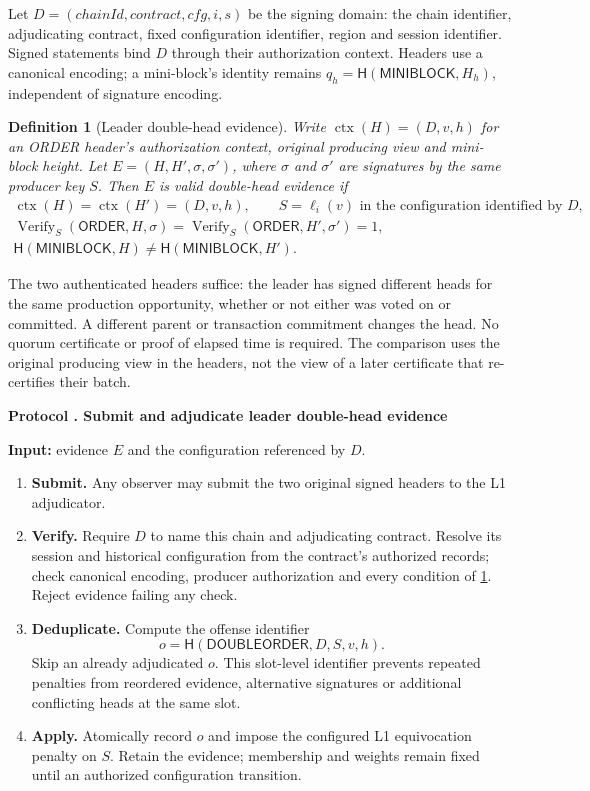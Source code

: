 \documentclass[11pt,a4paper,onecolumn]{article}
\newcommand{\Hash}{\mathsf H}
\newcommand{\Tag}[1]{\ensuremath{\mathsf{#1}}}
\newtheorem{definition}{Definition}[section]
\newcounter{protocol}
\newenvironment{protocol}[2]{\refstepcounter{protocol}\label{#1}
\begin{mdframed}[nobreak=true,linewidth=.6pt,skipabove=9pt,skipbelow=9pt,
innertopmargin=7pt,innerbottommargin=7pt]\small
\noindent\textbf{Protocol \theprotocol. #2}\par\smallskip}{\end{mdframed}}
\begin{document}
Let $D=(\mathit{chainId},\mathit{contract},\mathit{cfg},i,s)$ be the signing
domain: the chain identifier, adjudicating contract, fixed configuration
identifier, region and session identifier. Signed statements bind $D$ through their authorization
context. Headers use a canonical encoding; a mini-block's identity remains
$q_h=\Hash(\Tag{MINIBLOCK},H_h)$, independent of signature encoding.

\begin{definition}[Leader double-head evidence]\label{def:double-head}
Write $\operatorname{ctx}(H)=(D,v,h)$ for an ORDER header's authorization
context, original producing view and mini-block height. Let
$E=(H,H',\sigma,\sigma')$, where $\sigma$ and $\sigma'$ are signatures by
the same producer key $S$. Then $E$ is valid double-head evidence if
\[
 \begin{gathered}
 \operatorname{ctx}(H)=\operatorname{ctx}(H')=(D,v,h),
 \qquad S=\ell_i(v)\text{ in the configuration identified by }D,\\
 \operatorname{Verify}_{S}(\Tag{ORDER},H,\sigma)
 =\operatorname{Verify}_{S}(\Tag{ORDER},H',\sigma')=1,\\
 \Hash(\Tag{MINIBLOCK},H)\ne\Hash(\Tag{MINIBLOCK},H').
 \end{gathered}
\]
\end{definition}
The two authenticated headers suffice: the leader has signed different
heads for the same production opportunity, whether or not either was voted
on or committed. A different parent or transaction commitment changes the
head. No quorum certificate or proof of elapsed time is required.
The comparison uses the original producing view in the headers, not the view
of a later certificate that re-certifies their batch.

\begin{protocol}{alg:slash}{Submit and adjudicate leader double-head evidence}
\textbf{Input:} evidence $E$ and the configuration referenced by $D$.
\begin{enumerate}[label=\textbf{E\arabic*.}]
\item \textbf{Submit.} Any observer may submit the two original signed
headers to the L1 adjudicator.
\item \textbf{Verify.} Require $D$ to name this chain and adjudicating
contract. Resolve its session and historical configuration from the
contract's authorized records; check canonical encoding, producer
authorization and every condition of \cref{def:double-head}. Reject evidence
failing any check.
\item \textbf{Deduplicate.} Compute the offense identifier
\[
 o=\Hash(\Tag{DOUBLEORDER},D,S,v,h).
\]
Skip an already adjudicated $o$. This slot-level identifier prevents repeated
penalties from reordered evidence, alternative signatures or additional
conflicting heads at the same slot.
\item \textbf{Apply.} Atomically record $o$ and impose the configured L1
equivocation penalty on $S$. Retain the evidence; membership and weights
remain fixed until an authorized configuration transition.
\end{enumerate}
\end{protocol}
\end{document}
